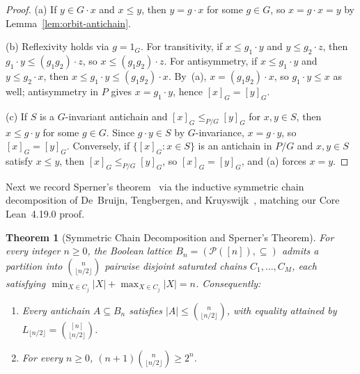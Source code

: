 \documentclass[11pt,a4paper]{article}
\newtheorem{theorem}{Theorem}[section]
\theoremstyle{definition}
\newcommand{\Bn}{B_n}
\begin{document}
\begin{proof}
(a) If $y \in G \cdot x$ and $x \le y$, then $y = g \cdot x$ for some $g \in G$, so $x = g \cdot x = y$ by Lemma~\ref{lem:orbit-antichain}.

(b) Reflexivity holds via $g = 1_G$. For transitivity, if $x \le g_1 \cdot y$ and $y \le g_2 \cdot z$, then $g_1 \cdot y \le (g_1 g_2) \cdot z$, so $x \le (g_1 g_2) \cdot z$. For antisymmetry, if $x \le g_1 \cdot y$ and $y \le g_2 \cdot x$, then $x \le g_1 \cdot y \le (g_1 g_2) \cdot x$. By~(a), $x = (g_1 g_2) \cdot x$, so $g_1 \cdot y \le x$ as well; antisymmetry in $P$ gives $x = g_1 \cdot y$, hence $[x]_G = [y]_G$.

(c) If $S$ is a $G$-invariant antichain and $[x]_G \le_{P/G} [y]_G$ for $x, y \in S$, then $x \le g \cdot y$ for some $g \in G$. Since $g \cdot y \in S$ by $G$-invariance, $x = g \cdot y$, so $[x]_G = [y]_G$. Conversely, if $\{[x]_G : x \in S\}$ is an antichain in $P/G$ and $x, y \in S$ satisfy $x \le y$, then $[x]_G \le_{P/G} [y]_G$, so $[x]_G = [y]_G$, and (a) forces $x = y$.
\end{proof}

Next we record Sperner's theorem~\cite{Sperner1928} via the inductive symmetric chain decomposition of De~Bruijn, Tengbergen, and Kruyswijk~\cite{DBTK1951}, matching our Core Lean~4.19.0 proof.

\begin{theorem}[Symmetric Chain Decomposition and Sperner's Theorem]\label{thm:sperner}
For every integer $n \ge 0$, the Boolean lattice $\Bn = (\mathcal{P}([n]), \subseteq)$ admits a partition into $\binom{n}{\lfloor n/2 \rfloor}$ pairwise disjoint saturated chains $C_1, \dots, C_M$, each satisfying $\min_{X \in C_j}|X| + \max_{X \in C_j}|X| = n$. Consequently:
\begin{enumerate}
  \item[(a)] Every antichain $A \subseteq \Bn$ satisfies $|A| \le \binom{n}{\lfloor n/2 \rfloor}$, with equality attained by $L_{\lfloor n/2 \rfloor} = \binom{[n]}{\lfloor n/2 \rfloor}$.
  \item[(b)] For every $n \ge 0$, $(n+1)\binom{n}{\lfloor n/2 \rfloor} \ge 2^n$.
\end{enumerate}
\end{theorem}
\end{document}
